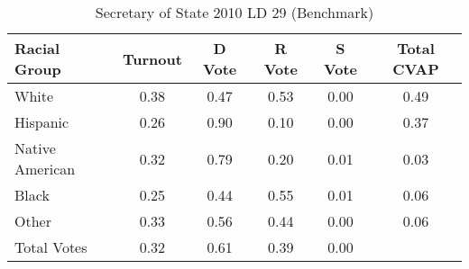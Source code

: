 \begin{table}[htb]
\begin{center}
\caption{Secretary of State 2010 LD 29 (Benchmark)}
\label{sos10_cvap_ld_29_benchmark}
\begin{tabular}{lccccc}
  \hline
Racial Group & Turnout & D Vote & R Vote & S Vote & Total CVAP \\ 
  \hline
White & 0.38 & 0.47 & 0.53 & 0.00 & 0.49 \\ 
  Hispanic & 0.26 & 0.90 & 0.10 & 0.00 & 0.37 \\ 
  Native American & 0.32 & 0.79 & 0.20 & 0.01 & 0.03 \\ 
  Black & 0.25 & 0.44 & 0.55 & 0.01 & 0.06 \\ 
  Other & 0.33 & 0.56 & 0.44 & 0.00 & 0.06 \\ 
  Total Votes & 0.32 & 0.61 & 0.39 & 0.00 &  \\ 
   \hline
\end{tabular}
\end{center}
\end{table}
